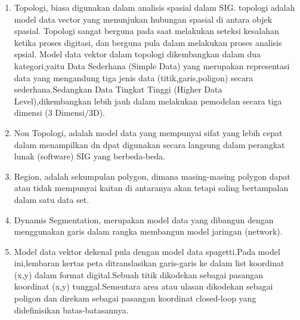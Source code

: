 \begin{enumerate} 
\item 
Topologi, biasa digunakan dalam analisis spasial dalam SIG. topologi adalah model data vector yang menunjukan hubungan spasial di antara objek spasial. Topologi sangat berguna pada saat melakukan seteksi kesalahan ketika proses digitasi, dan berguna pula dalam melakukan proses analisis spsial.
Model data vektor dalam topologi dikembangkan dalam dua kategori,yaitu Data Sederhana (Simple Data) yang merupakan representasi data yang mengandung tiga jenis data (titik,garis,poligon) secara sederhana.Sedangkan Data Tingkat Tinggi (Higher Data Level),dikembangkan lebih jauh dalam melakukan pemodelan secara tiga dimensi (3 Dimensi/3D).
\item
Non Topologi, adalah model data yang mempunyai sifat yang lebih cepat dalam menampilkan dn dpat digunakan secara langsung dalam perangkat lunak (software) SIG yang berbeda-beda.
\item
Region, adalah sekumpulan polygon, dimana masing-masing polygon dapat atau tidak mempunyai kaitan di antaranya akan tetapi saling bertampalan dalam satu data set.
\item
Dynamis Segmentation, merupakan model data yang dibangun dengan menggunakan garis dalam rangka membangun model jaringan (network).
\item
Model data vektor dekenal pula dengan model data spagetti.Pada model ini,lembaran kertas peta ditranslasikan garis-garis 
ke dalam list koordinat (x,y) dalam format digital.Sebuah titik dikodekan sebagai pasangan koordinat (x,y) tunggal.Sementara area atau ulasan dikodekan sebagai poligon dan direkam sebagai pasangan koordinat closed-loop yang didefinisikan batas-batasannya.
\end{enumerate}


